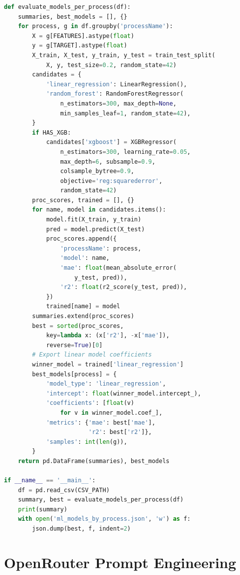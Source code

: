 \documentclass[12pt,a4paper]{report}
\newcommand{\code}[1]{\texttt{#1}}
\begin{document}
\begin{lstlisting}[language=Python, caption={Per-process model comparison script (\code{colab\_per\_process\_compare.py}).}, label={lst:mlscript}]
def evaluate_models_per_process(df):
    summaries, best_models = [], {}
    for process, g in df.groupby('processName'):
        X = g[FEATURES].astype(float)
        y = g[TARGET].astype(float)
        X_train, X_test, y_train, y_test = train_test_split(
            X, y, test_size=0.2, random_state=42)
        candidates = {
            'linear_regression': LinearRegression(),
            'random_forest': RandomForestRegressor(
                n_estimators=300, max_depth=None,
                min_samples_leaf=1, random_state=42),
        }
        if HAS_XGB:
            candidates['xgboost'] = XGBRegressor(
                n_estimators=300, learning_rate=0.05,
                max_depth=6, subsample=0.9,
                colsample_bytree=0.9,
                objective='reg:squarederror',
                random_state=42)
        proc_scores, trained = [], {}
        for name, model in candidates.items():
            model.fit(X_train, y_train)
            pred = model.predict(X_test)
            proc_scores.append({
                'processName': process,
                'model': name,
                'mae': float(mean_absolute_error(
                    y_test, pred)),
                'r2': float(r2_score(y_test, pred)),
            })
            trained[name] = model
        summaries.extend(proc_scores)
        best = sorted(proc_scores,
            key=lambda x: (x['r2'], -x['mae']),
            reverse=True)[0]
        # Export linear model coefficients
        winner_model = trained['linear_regression']
        best_models[process] = {
            'model_type': 'linear_regression',
            'intercept': float(winner_model.intercept_),
            'coefficients': [float(v)
                for v in winner_model.coef_],
            'metrics': {'mae': best['mae'],
                        'r2': best['r2']},
            'samples': int(len(g)),
        }
    return pd.DataFrame(summaries), best_models

if __name__ == '__main__':
    df = pd.read_csv(CSV_PATH)
    summary, best = evaluate_models_per_process(df)
    print(summary)
    with open('ml_models_by_process.json', 'w') as f:
        json.dump(best, f, indent=2)
\end{lstlisting}

\section{OpenRouter Prompt Engineering}
\end{document}
